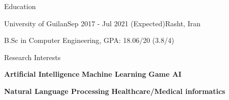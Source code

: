 \documentclass{resume} %
\begin{document}

\begin{rSection}{Education}
\begin{rSubsection}{University of Guilan}{Sep 2017 - Jul 2021 (Expected)}{}{\normalfont Rasht, Iran}
\item B.Sc in Computer Engineering, GPA: 18.06/20 (3.8/4)
\end{rSubsection}



\end{rSection}


\begin{rSection}{Research Interests}

\textbf{Artificial Intelligence} \quad\quad\quad\quad\quad\quad\qquad
\textbf{Machine Learning} \quad\quad\qquad\qquad\qquad\qquad\qquad
\textbf{Game AI} 

\qquad\qquad\qquad\quad \textbf{Natural Language Processing} \quad\quad\quad\quad
\textbf{Healthcare/Medical informatics} 

\end{rSection}
\end{document}
